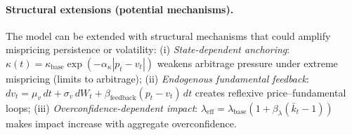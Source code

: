 \begin{proposition}
\begin{enumerate}[label=(\roman*)]
\end{enumerate}
\end{proposition}

\paragraph{Structural extensions (potential mechanisms).}
The model can be extended with structural mechanisms that could amplify mispricing persistence or volatility:
(i) \emph{State-dependent anchoring}: $\kappa(t) = \kappa_{\text{base}} \exp(-\alpha_\kappa |p_t - v_t|)$ weakens arbitrage pressure under extreme mispricing (limits to arbitrage);
(ii) \emph{Endogenous fundamental feedback}: $dv_t = \mu_v\,dt + \sigma_v\,dW_t + \beta_{\text{feedback}} (p_t - v_t)\,dt$ creates reflexive price--fundamental loops;
(iii) \emph{Overconfidence-dependent impact}: $\lambda_{\text{eff}} = \lambda_{\text{base}} (1 + \beta_\lambda (\bar k_t - 1))$ makes impact increase with aggregate overconfidence.

